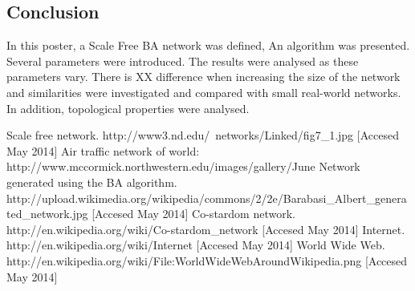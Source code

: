 \documentclass[a0,final]{a0poster}
\begin{document}
\begin{multicols}{3}
\section*{Conclusion}
In this poster, a Scale Free BA network was defined, An algorithm was presented. Several parameters were introduced. The results were analysed as these parameters vary. There is XX difference when increasing the size of the network and similarities were investigated and compared with small real-world networks. In addition, topological properties were analysed. 


\begin{bibliography}{6}

 Scale free network. http://www3.nd.edu/~networks/Linked/fig7_1.jpg [Accesed May 2014]
 Air traffic network of world: http://www.mccormick.northwestern.edu/images/gallery/June%
 Network generated using the BA algorithm. http://upload.wikimedia.org/wikipedia/commons/2/2e/Barabasi_Albert_generated_network.jpg [Accesed May 2014]
 Co-stardom network. http://en.wikipedia.org/wiki/Co-stardom_network [Accesed May 2014]
 Internet. http://en.wikipedia.org/wiki/Internet [Accesed May 2014]
 World Wide Web. http://en.wikipedia.org/wiki/File:WorldWideWebAroundWikipedia.png [Accesed May 2014]

\end{bibliography}

\end{multicols}
\end{document}
